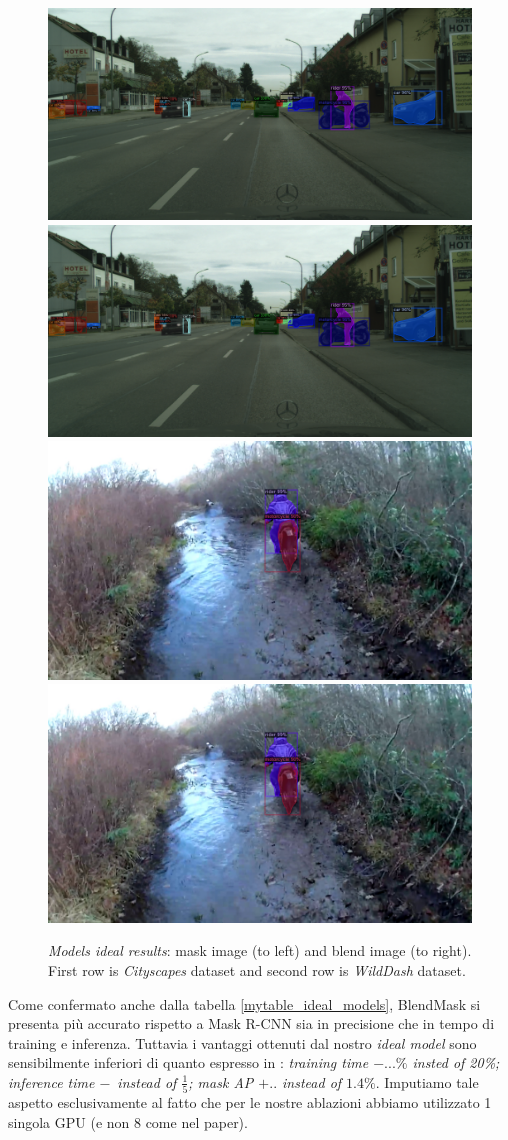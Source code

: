 \documentclass[10pt,twocolumn,letterpaper]{article}
\begin{document}
\begin{figure}[H]
\centering
 \includegraphics[width=0.45\linewidth]{./image/ideal_model_mask_city.png} \includegraphics[width=0.45\linewidth]{./image/ideal_model_mask_city.png} 
   \includegraphics[width=0.45\linewidth]{./image/ideal_model_mask_wd.png}  	\includegraphics[width=0.45\linewidth]{./image/ideal_model_mask_wd.png}   
  \caption{\textit{Models ideal results}: mask image (to left) and blend image (to right). First row is \textit{Cityscapes} dataset and second row is \textit{WildDash} dataset.}
  \label{fig:result_model_ideal}
\noindent
\end{figure}
Come confermato anche dalla tabella \ref{mytable_ideal_models}, BlendMask si presenta pi\`u accurato rispetto a Mask R-CNN sia in precisione che in tempo di training e inferenza. Tuttavia i vantaggi ottenuti dal nostro \textit{ideal model} sono sensibilmente inferiori di quanto espresso in \cite{Authors2_BlendMask}: \textit{training time $-...\% $ insted of 20\%; inference time $-\frac{}{}$ instead of $\frac{1}{5}$; mask AP $+..$ instead of $1.4\%$}. Imputiamo tale aspetto esclusivamente al fatto che per le nostre ablazioni abbiamo utilizzato 1 singola GPU (e non 8 come nel paper).
\end{document}
